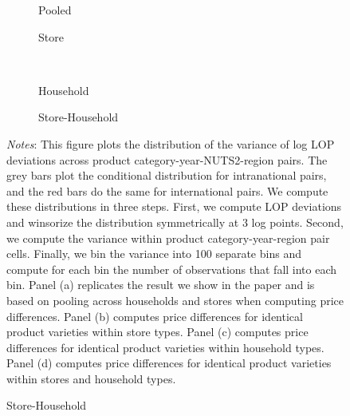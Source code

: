  \begin{figure}[H]
    \centering
    \caption{Variance of LOP deviations - Unweighted}
    \label{fig: app_redform_sd_unw}
    \begin{subfigure}[t]{.49\textwidth}
         \centering
         \caption{Pooled}
         \scalebox{0.45}{}
     \end{subfigure}
     \begin{subfigure}[t]{.49\textwidth}
         \centering
         \caption{Store}
         \scalebox{0.45}{}
     \end{subfigure}\\
     \begin{subfigure}[t]{.49\textwidth}
         \centering
         \caption{Household}
         \scalebox{0.45}{}
     \end{subfigure}
     \begin{subfigure}[t]{.49\textwidth}
         \centering
         \caption{Store-Household}
         \scalebox{0.45}{}
     \end{subfigure}
     \parbox{\textwidth}{
        \begin{spacing}{1} 
            {\footnotesize 
            \textit{Notes}: This figure plots the distribution of the variance of log LOP deviations across product category-year-NUTS2-region pairs. The grey bars plot the conditional distribution for intranational pairs, and the red bars do the same for international pairs. We compute these distributions in three steps. First, we compute LOP deviations and winsorize the distribution symmetrically at 3 log points. Second, we compute the variance within product category-year-region pair cells. Finally, we bin the variance into 100 separate bins and compute for each bin the number of observations that fall into each bin. Panel (a) replicates the result we show in the paper and is based on pooling across households and stores when computing price differences. Panel (b) computes price differences for identical product varieties within store types. Panel (c) computes price differences for identical product varieties within household types. Panel (d) computes price differences for identical product varieties within stores and household types.}
        \end{spacing}}
 \end{figure} 

